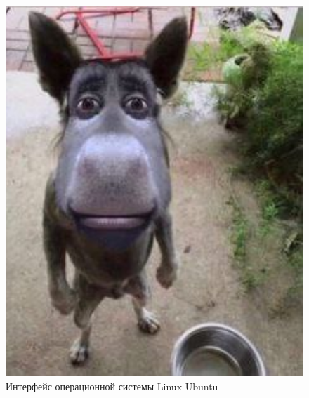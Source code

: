 \begin{figure}[H]
  \centering
  \includegraphics[width=1\textwidth]{image/5.jpg}
  \caption{Интерфейс операционной системы Linux Ubuntu}
  \label{Linux}
\end{figure}

